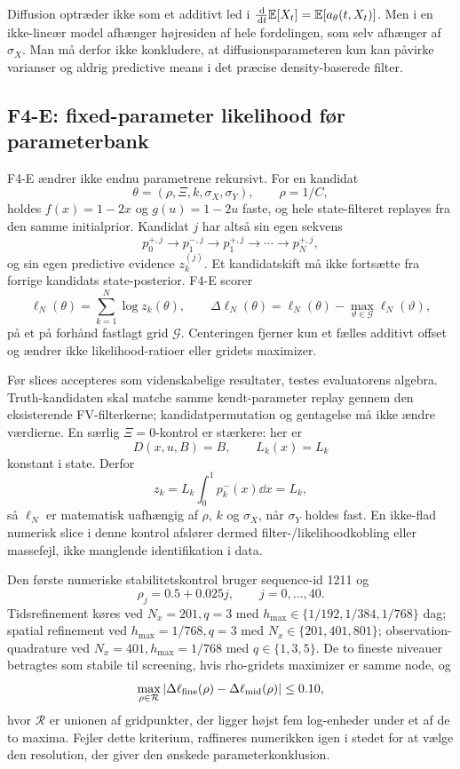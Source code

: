 Diffusion optræder ikke som et additivt led i \(\frac{\,\mathrm d}{\,\mathrm d t}\mathbb E[X_t]=\mathbb E[a_\theta(t,X_t)]\). Men i en ikke-lineær model afhænger højresiden af hele fordelingen, som selv afhænger af \(\sigma_X\). Man må derfor ikke konkludere, at diffusionsparameteren kun kan påvirke varianser og aldrig predictive means i det præcise density-baserede filter.


\subsection{F4-E: fixed-parameter likelihood før parameterbank}
F4-E ændrer ikke endnu parametrene rekursivt. For en kandidat
\[
 \theta=(\rho,\Xi,k,\sigma_X,\sigma_Y),\qquad \rho=1/C,
\]
holdes \(f(x)=1-2x\) og \(g(u)=1-2u\) faste, og hele state-filteret replayes fra den
samme initialprior. Kandidat \(j\) har altså sin egen sekvens
\[
 p_{0}^{+,j}\longrightarrow p_{1}^{-,j}\longrightarrow p_{1}^{+,j}
 \longrightarrow\cdots\longrightarrow p_N^{+,j},
\]
og sin egen predictive evidence \(z_k^{(j)}\). Et kandidatskift må ikke fortsætte fra
forrige kandidats state-posterior. F4-E scorer
\begin{equation}
 \ell_N(\theta)=\sum_{k=1}^{N}\log z_k(\theta),\qquad
 \Delta\ell_N(\theta)=\ell_N(\theta)-\max_{\vartheta\in\mathcal G}\ell_N(\vartheta),
 \label{eq:f4e-centered-likelihood}
\end{equation}
på et på forhånd fastlagt grid \(\mathcal G\). Centeringen fjerner kun et fælles additivt
offset og ændrer ikke likelihood-ratioer eller gridets maximizer.

Før slices accepteres som videnskabelige resultater, testes evaluatorens algebra.
Truth-kandidaten skal matche samme kendt-parameter replay gennem den eksisterende
FV-filterkerne; kandidatpermutation og gentagelse må ikke ændre værdierne. En særlig
\(\Xi=0\)-kontrol er stærkere: her er
\[
 D(x,u,B)=B,\qquad L_k(x)=L_k
\]
konstant i state. Derfor
\[
 z_k=L_k\int_0^1p_k^-(x)\dd x=L_k,
\]
så \(\ell_N\) er matematisk uafhængig af \(\rho\), \(k\) og \(\sigma_X\), når
\(\sigma_Y\) holdes fast. En ikke-flad numerisk slice i denne kontrol afslører dermed
filter-/likelihoodkobling eller massefejl, ikke manglende identifikation i data.

Den første numeriske stabilitetskontrol bruger sequence-id 1211 og
\[
 \rho_j=0.5+0.025j,\qquad j=0,\ldots,40.
\]
Tidsrefinement køres ved \(N_x=201,q=3\) med
\(h_{\max}\in\{1/192,1/384,1/768\}\) dag; spatial refinement ved
\(h_{\max}=1/768,q=3\) med \(N_x\in\{201,401,801\}\); observation-quadrature ved
\(N_x=401,h_{\max}=1/768\) med \(q\in\{1,3,5\}\). De to fineste niveauer
betragtes som stabile til screening, hvis rho-gridets maximizer er samme node, og
\begin{equation}
 \max_{\rho\in\mathcal R}
 |\Delta\ell_{\rm fine}(\rho)-\Delta\ell_{\rm mid}(\rho)|\le0.10,
 \label{eq:f4e-numerical-gate}
\end{equation}
hvor \(\mathcal R\) er unionen af gridpunkter, der ligger højst fem log-enheder under
et af de to maxima. Fejler dette kriterium, raffineres numerikken igen i stedet for at
vælge den resolution, der giver den ønskede parameterkonklusion.

